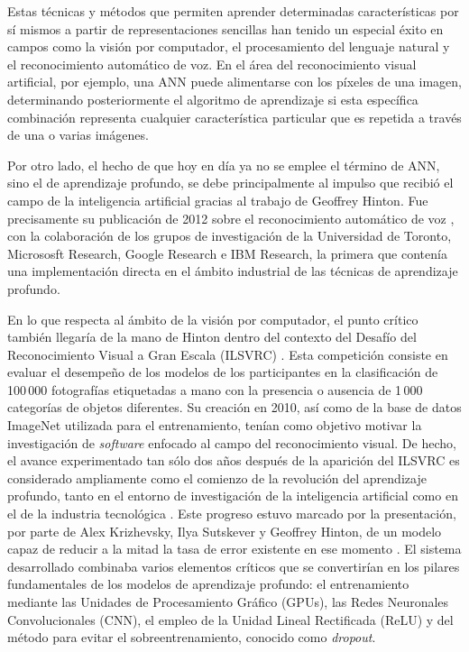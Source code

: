 Estas técnicas y métodos que permiten aprender determinadas características por sí mismos a partir de representaciones sencillas han tenido un especial éxito en campos como la visión por computador, el procesamiento del lenguaje natural y el reconocimiento automático de voz. En el área del reconocimiento visual artificial, por ejemplo, una ANN puede alimentarse con los píxeles de una imagen, determinando posteriormente el algoritmo de aprendizaje si esta específica combinación representa cualquier característica particular que es repetida a través de una o varias imágenes.

Por otro lado, el hecho de que hoy en día ya no se emplee el término de ANN, sino el de aprendizaje profundo, se debe principalmente al impulso que recibió el campo de la inteligencia artificial gracias al trabajo de Geoffrey Hinton. Fue precisamente su publicación de 2012 sobre el reconocimiento automático de voz \cite{Hinton}, con la colaboración de los grupos de investigación de la Universidad de Toronto, Micrososft Research, Google Research e IBM Research, la primera que contenía una implementación directa en el ámbito industrial de las técnicas de aprendizaje profundo.

En lo que respecta al ámbito de la visión por computador, el punto crítico también llegaría de la mano de Hinton dentro del contexto del Desafío del Reconocimiento Visual a Gran Escala (ILSVRC) \cite{ILSVRC}. Esta competición consiste en evaluar el desempeño de los modelos de los participantes en la clasificación de 100\,000 fotografías etiquetadas a mano con la presencia o ausencia de 1\,000 categorías de objetos diferentes. Su creación en 2010, así como de la base de datos ImageNet utilizada para el entrenamiento, tenían como objetivo motivar la investigación de \textit{software} enfocado al campo del reconocimiento visual. De hecho, el avance experimentado tan sólo dos años después de la aparición del ILSVRC es considerado ampliamente como el comienzo de la revolución del aprendizaje profundo, tanto en el entorno de investigación de la inteligencia artificial como en el de la industria tecnológica \cite{AIboom}. Este progreso estuvo marcado por la presentación, por parte de Alex Krizhevsky, Ilya Sutskever y Geoffrey Hinton, de un modelo capaz de reducir a la mitad la tasa de error existente en ese momento \cite{Krizhevsky}. El sistema desarrollado combinaba varios elementos críticos que se convertirían en los pilares fundamentales de los modelos de aprendizaje profundo: el entrenamiento mediante las Unidades de Procesamiento Gráfico (GPUs), las Redes Neuronales Convolucionales (CNN), el empleo de la Unidad Lineal Rectificada (ReLU) y del método para evitar el sobreentrenamiento, conocido como \textit{dropout}.

